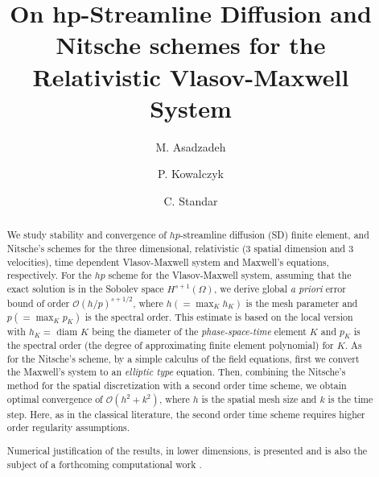 \documentclass[reqno,a4paper]{amsart}
\theoremstyle{remark}
\numberwithin{equation}{section}
\begin{document}
\title[hp-SD Schemes for the Vlasov-Maxwell System]
{On hp-Streamline Diffusion and Nitsche schemes for the Relativistic Vlasov-Maxwell System}

\author[M.~Asadzadeh]{M. Asadzadeh}

\address{ 
Department of Mathematics, 
Chalmers University of Technology and  G\"oteborg University, 
SE--412 96, G\"oteborg, Sweden
} 



\author[P.~Kowalczyk]{P. Kowalczyk}

\address{
Institute of Applied Mathematics and Mechanics,
University of Warsaw,
Banacha 2, 02-097 Warszawa, Poland
}

\author[C.~Standar]{C. Standar}

\address{
Department of Mathematics,
Chalmers University of Technology and  G\"oteborg University,
SE--412 96, G\"oteborg, Sweden
}






\begin{abstract}  
We  study stability and convergence of 
 $hp$-streamline diffusion (SD) finite element, 
and Nitsche's schemes for the three dimensional,  
relativistic (3 spatial dimension and 3 velocities), time dependent 
 Vlasov-Maxwell system 
and Maxwell's equations, respectively.  
For the $hp$ scheme for the Vlasov-Maxwell system, 
assuming that the exact solution is in the Sobolev space 
$H^{s+1}(\Omega)$, we derive global {\sl a priori} error bound of 
order ${\mathcal O}(h/p)^{s+1/2}$, 
where $h (= \max_K h_K)$ is the mesh parameter and $p (= \max_K p_K)$ 
is the spectral order. 
This estimate is based on the local version with $h_K=\mbox{ diam } K$ 
being the diameter of the {\sl phase-space-time} element $K$ and 
$p_K$ is the spectral order (the degree of approximating finite element 
polynomial) for $K$. 
As for the 
Nitsche's scheme, by a simple calculus of the field equations,  
first we convert the Maxwell's system to an {\sl elliptic type} 
 equation. 
Then, combining the Nitsche's method for the spatial discretization 
with a second order time scheme, we obtain optimal convergence of 
 ${\mathcal O}(h^2+k^2)$, where $h$ is the spatial mesh size and 
$k$ is the time step. Here, as in the classical literature, the second 
order time scheme requires higher order regularity assumptions. 

Numerical justification of the results, in 
lower dimensions, is presented
and is also the subject of a forthcoming computational work 
\cite{Malmberg_Standar}. 



\end{abstract}
\end{document}
